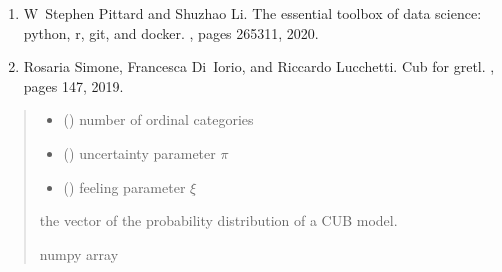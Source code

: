 \documentclass[letterpaper,10pt,english]{sphinxmanual}
\begin{document}
\begin{fulllineitems}
\begin{description}
\begin{enumerate}
\item {} 
\sphinxAtStartPar
W Stephen Pittard and Shuzhao Li. The essential toolbox of data science: python, r, git, and docker. , pages 265\textendash{}311, 2020.

\item {} 
\sphinxAtStartPar
Rosaria Simone, Francesca Di Iorio, and Riccardo Lucchetti. Cub for gretl. , pages 147, 2019.

\end{enumerate}

\end{description}
\begin{quote}\begin{description}
\begin{itemize}
\item {} 
\sphinxAtStartPar
{} () \textendash{} number of ordinal categories

\item {} 
\sphinxAtStartPar
{} () \textendash{} uncertainty parameter \(\pi\)

\item {} 
\sphinxAtStartPar
{} () \textendash{} feeling parameter \(\xi\)

\end{itemize}

\sphinxAtStartPar
the vector of the probability distribution of a CUB model.

\sphinxAtStartPar
numpy array

\end{description}\end{quote}

\end{fulllineitems}

\end{document}
